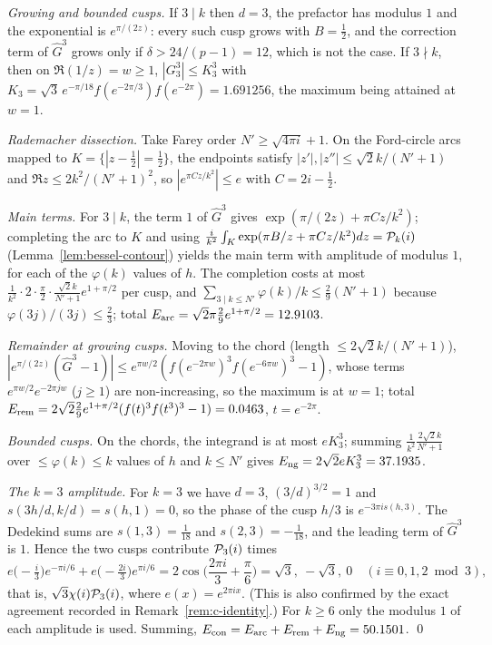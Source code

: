 \emph{Growing and bounded cusps.} If $3\mid k$ then $d=3$, the prefactor has modulus $1$ and the exponential is
$e^{\pi/(2z)}$: every such cusp grows with $B=\frac12$, and the correction term of $\widehat G^3$ grows only if
$\delta>24/(p-1)=12$, which is not the case. If $3\nmid k$, then on $\Re(1/z)=w\ge1$, $|G_3^3|\le K_3^3$ with
$K_3=\sqrt3\,e^{-\pi/18}f(e^{-2\pi/3})f(e^{-2\pi})=1.691256$, the maximum being attained at $w=1$.

\emph{Rademacher dissection.} Take Farey order $N'\ge\sqrt{4\pi i}+1$. On the Ford-circle arcs mapped to
$K=\{|z-\frac12|=\frac12\}$, the endpoints satisfy $|z'|,|z''|\le\sqrt2k/(N'+1)$ and $\Re z\le2k^2/(N'+1)^2$, so
$|e^{\pi Cz/k^2}|\le e$ with $C=2i-\frac12$.

\emph{Main terms.} For $3\mid k$, the term $1$ of $\widehat G^3$ gives $\exp(\pi/(2z)+\pi Cz/k^2)$; completing the arc to
$K$ and using $\frac i{k^2}\int_K\exp(\pi B/z+\pi Cz/k^2)dz=\mathcal P_k(i)$ (Lemma~\ref{lem:bessel-contour}) yields the main term
with amplitude of modulus $1$, for each of the $\varphi(k)$ values of $h$. The completion costs at most
$\frac1{k^2}\cdot2\cdot\frac\pi2\cdot\frac{\sqrt2k}{N'+1}e^{1+\pi/2}$ per cusp, and
$\sum_{3\mid k\le N'}\varphi(k)/k\le\frac29(N'+1)$ because $\varphi(3j)/(3j)\le\frac23$; total
$E_{\rm arc}=\sqrt2\pi\frac29e^{1+\pi/2}=12.9103$.

\emph{Remainder at growing cusps.} Moving to the chord (length $\le2\sqrt2k/(N'+1)$),
$|e^{\pi/(2z)}(\widehat G^3-1)|\le e^{\pi w/2}(f(e^{-2\pi w})^3f(e^{-6\pi w})^3-1)$, whose terms $e^{\pi w/2}e^{-2\pi jw}$
($j\ge1$) are non-increasing, so the maximum is at $w=1$; total
$E_{\rm rem}=2\sqrt2\frac29e^{1+\pi/2}(f(t)^3f(t^3)^3-1)=0.0463$, $t=e^{-2\pi}$.

\emph{Bounded cusps.} On the chords, the integrand is at most $eK_3^3$; summing $\frac1{k^2}\frac{2\sqrt2k}{N'+1}$ over
$\le\varphi(k)\le k$ values of $h$ and $k\le N'$ gives $E_{\rm ng}=2\sqrt2eK_3^3=37.1935$.

\emph{The $k=3$ amplitude.} For $k=3$ we have $d=3$, $(3/d)^{3/2}=1$ and $s(3h/d,k/d)=s(h,1)=0$, so the phase of the cusp
$h/3$ is $e^{-3\pi is(h,3)}$. The Dedekind sums are $s(1,3)=\frac1{18}$ and $s(2,3)=-\frac1{18}$, and the leading term of
$\widehat G^3$ is $1$. Hence the two cusps contribute $\mathcal P_3(i)$ times
\[
e\big(-\tfrac i3\big)e^{-\pi i/6}+e\big(-\tfrac{2i}3\big)e^{\pi i/6}=2\cos\Big(\frac{2\pi i}3+\frac\pi6\Big)=\sqrt3,\ -\sqrt3,\ 0
\quad(i\equiv0,1,2\bmod 3),
\]
that is, $\sqrt3\chi(i)\mathcal P_3(i)$, where $e(x)=e^{2\pi ix}$. (This is also confirmed by the exact agreement recorded in
Remark~\ref{rem:c-identity}.) For $k\ge6$ only the modulus $1$ of each amplitude is used. Summing,
$E_{\mathrm{con}}=E_{\rm arc}+E_{\rm rem}+E_{\rm ng}=50.1501$.
\qed
